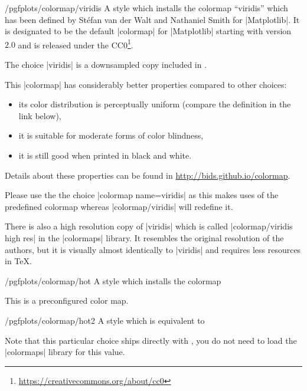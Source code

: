 \begin{stylekey}{/pgfplots/colormap/viridis}
	A style which installs the colormap ``viridis'' which has been defined by St\'efan van der Walt and Nathaniel Smith for |Matplotlib|. It is designated to be the default |colormap| for |Matplotlib| starting with version~$2.0$ and is released under the CC0\footnote{\url{https://creativecommons.org/about/cc0}}. 

	The choice |viridis| is a downsampled copy included in \PGFPlots.

\begin{codeexample}
\pgfplotsset{
	colormap name=viridis,
}
\end{codeexample}

	This |colormap| has considerably better properties compared to other choices:
	\begin{itemize} 
	\item its color distribution is perceptually uniform (compare the definition in the link below),
	\item it is suitable for moderate forms of color blindness,
	\item it is still good when printed in black and white.
	\end{itemize}
	Details about these properties can be found in \url{http://bids.github.io/colormap}.

	Please use the the choice |colormap name=viridis| as this makes uses of the predefined colormap whereas |colormap/viridis| will redefine it.

	There is also a high resolution copy of |viridis| which is called |colormap/viridis high res| in the |colormaps| library. It resembles the original resolution of the authors, but it is visually almost identically to |viridis| and requires less resources in \TeX.
\end{stylekey}

\begin{stylekey}{/pgfplots/colormap/hot}
	A style which installs the colormap
\begin{codeexample}
\end{codeexample}


	This is a preconfigured color map.
\end{stylekey}

\begin{stylekey}{/pgfplots/colormap/hot2}
	A style which is equivalent to 
\begin{codeexample}
\end{codeexample}


	Note that this particular choice ships directly with \PGFPlots, you do not need to load the |colormaps| library for this value.

	\matlabcolormaptext
\end{stylekey}

